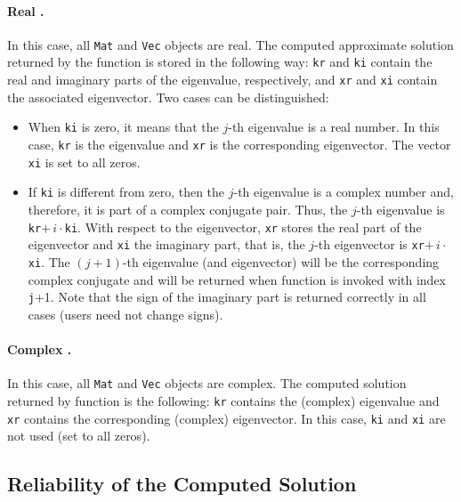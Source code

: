 \paragraph{Real \slepc.} In this case, all \texttt{Mat} and \texttt{Vec} objects are real. The computed approximate solution returned by the function  is stored in the following way: \texttt{kr} and \texttt{ki} contain the real and imaginary parts of the eigenvalue, respectively, and \texttt{xr} and \texttt{xi} contain the associated eigenvector. Two cases can be distinguished:

\begin{itemize}
\item When \texttt{ki} is zero, it means that the $j$-th eigenvalue is a real number. In this case, \texttt{kr} is the eigenvalue and \texttt{xr} is the corresponding eigenvector. The vector \texttt{xi} is set to all zeros.

\item If \texttt{ki} is different from zero, then the $j$-th eigenvalue is a complex number and, therefore, it is part of a complex conjugate pair. Thus, the $j$-th eigenvalue is \texttt{kr}$+\,i\cdot$\texttt{ki}.
With respect to the eigenvector, \texttt{xr} stores the real part of the eigenvector and \texttt{xi} the imaginary part, that is, the $j$-th eigenvector is \texttt{xr}$+\,i\cdot$\texttt{xi}. The $(j+1)$-th eigenvalue (and eigenvector) will be the corresponding complex conjugate and will be returned when function  is invoked with index \texttt{j}+1. Note that the sign of the imaginary part is returned correctly in all cases (users need not change signs).
\end{itemize}

\paragraph{Complex \slepc.} In this case, all \texttt{Mat} and \texttt{Vec} objects are complex. The computed solution returned by function  is the following: \texttt{kr} contains the (complex) eigenvalue and \texttt{xr} contains the corresponding (complex) eigenvector. In this case, \texttt{ki} and \texttt{xi} are not used (set to all zeros).

\subsection{Reliability of the Computed Solution}
\label{sec:errbnd}

